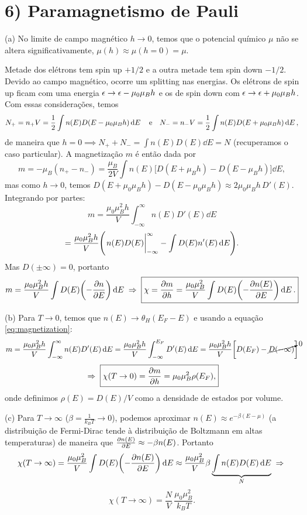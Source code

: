\documentclass[a4paper,10pt]{article}
\begin{document}
\section*{6) Paramagnetismo de Pauli}

(a) No limite de campo magnético $h \to 0$, temos que o potencial químico $\mu$ não se altera significativamente, $\mu(h) \approx \mu(h = 0) = \mu$.

Metade dos elétrons tem spin up $+1/2$ e a outra metade tem spin down $-1/2$. Devido ao campo magnético, ocorre um splitting nas energias. Os elétrons de spin up ficam com uma energia $\epsilon \to \epsilon - \mu_0 \mu_B h$ e os de spin down com $\epsilon \to \epsilon + \mu_0 \mu_B h$. Com essas considerações, temos
$$
N_+ = n_+ V = \frac{1}{2} \int n(E) D(E - \mu_0 \mu_B h) \dd{E} \quad \mathrm{e} \quad
N_- = n_- V = \frac{1}{2} \int n(E) D(E + \mu_0 \mu_B h) \dd{E},
$$
de maneira que $h = 0 \implies N_+ + N_- = \int n(E) D(E) \dd{E} = N$ (recuperamos o caso particular). A magnetização $m$ é então dada por
$$
m = - \mu_B (n_+ - n_-) =
\frac{\mu_B}{2V} \int n(E) \Big[ D(E + \mu_B h) - D(E - \mu_B h) \Big] \dd{E},
$$
mas como $h \to 0$, temos $D(E + \mu_0 \mu_B h) - D(E - \mu_0 \mu_B h) \approx 2 \mu_0 \mu_B h \, D'(E)$. Integrando por partes:
\begin{equation} \label{eq:magnetization}
m = \frac{\mu_0 \mu_B^2 h}{V} \int_{-\infty}^{\infty} n(E) D'(E) \dd{E}
\end{equation}
$$
= \frac{\mu_0 \mu_B^2 h}{V} \qty(\eval{n(E) D(E)}_{-\infty}^{\infty} - \int D(E) n'(E) \dd{E} ).
$$
Mas $D(\pm\infty) = 0$, portanto
$$
m = \frac{\mu_0 \mu_B^2 h}{V} \int D(E) \qty(- \pdv{n}{E}) \dd{E} \; \Rightarrow \;
\boxed{ \chi = \pdv{m}{h} = \frac{\mu_0 \mu_B^2}{V} \int D(E) \qty(- \pdv{n(E)}{E}) \dd{E}. }
$$

\n\n

(b) Para $T \to 0$, temos que $n(E) \to \theta_H(E_F-E)$ e usando a equação \ref{eq:magnetization}:
$$
m = \frac{\mu_0 \mu_B^2 h}{V} \int_{-\infty}^{\infty} n(E) D'(E) \dd{E} =
\frac{\mu_0 \mu_B^2 h}{V} \int_{-\infty}^{E_F} D'(E) \dd{E} =
\frac{\mu_0 \mu_B^2 h}{V} \qty[ D(E_F) - \cancelto{0}{D(-\infty)} ]
$$
$$
\; \Rightarrow \; \boxed{ \chi(T\to 0) = \pdv{m}{h} = \mu_0 \mu_B^2 \rho(E_F), }
$$
onde definimos $\rho(E) = D(E) / V$ como a densidade de estados por volume.

\n\n

(c) Para $T \to \infty$ ($\beta = \frac{1}{k_B T} \to 0$), podemos aproximar $n(E) \approx e^{-\beta(E - \mu)}$ (a distribuição de Fermi-Dirac tende à distribuição de Boltzmann em altas temperaturas) de maneira que $\pdv{n(E)}{E} \approx -\beta n(E)$. Portanto
$$
\chi(T \to \infty) = \frac{\mu_0\mu_B^2}{V} \int D(E) \qty(- \pdv{n(E)}{E}) \dd{E} \approx
\frac{\mu_0\mu_B^2}{V} \beta \underbrace{\int n(E) D(E) \dd{E}}_{N} \; \Rightarrow \;
$$
$$
\boxed{ \chi(T\to\infty) = \frac{N}{V} \, \frac{\mu_0 \mu_B^2}{k_B T}. }
$$

\pagebreak
\end{document}
